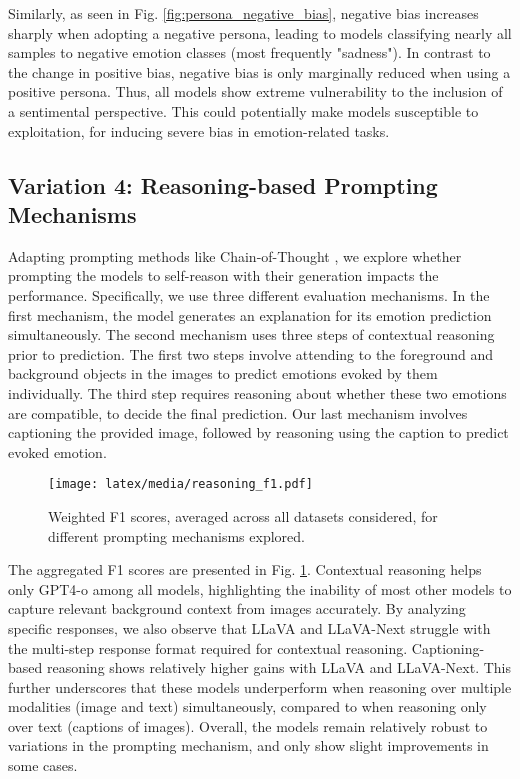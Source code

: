 Similarly, as seen in Fig. \ref{fig:persona_negative_bias}, negative bias increases sharply when adopting a negative persona, leading to models classifying nearly all samples to negative emotion classes (most frequently "sadness"). In contrast to the change in positive bias, negative bias is only marginally reduced when using a positive persona. Thus, all models show extreme vulnerability to the inclusion of a sentimental perspective. This could potentially make models susceptible to exploitation, for inducing severe bias in emotion-related tasks. 

\subsection{Variation 4: Reasoning-based Prompting Mechanisms}
\label{sec:reasoning}

Adapting prompting methods like Chain-of-Thought \cite{wei2022chain}, we explore whether prompting the models to self-reason with their generation impacts the performance. Specifically, we use three different evaluation mechanisms. In the first mechanism, the model generates an explanation for its emotion prediction simultaneously. The second mechanism uses three steps of contextual reasoning prior to prediction. The first two steps involve attending to the foreground and background objects in the images to predict emotions evoked by them individually. The third step requires reasoning about whether these two emotions are compatible, to decide the final prediction. Our last mechanism involves captioning the provided image, followed by reasoning using the caption to predict evoked emotion. 

\begin{figure}
    \centering
    \texttt{[image: latex/media/reasoning\_f1.pdf]}
    \caption{Weighted F1 scores, averaged across all datasets considered, for different prompting mechanisms explored.}
    \label{fig:reasoning_f1}
\end{figure}

The aggregated F1 scores are presented in Fig. \ref{fig:reasoning_f1}. Contextual reasoning helps only GPT4-o among all models, highlighting the inability of most other models to capture relevant background context from images accurately. By analyzing specific responses, we also observe that LLaVA and LLaVA-Next struggle with the multi-step response format required for contextual reasoning. Captioning-based reasoning shows relatively higher gains with LLaVA and LLaVA-Next. This further underscores that these models underperform when reasoning over multiple modalities (image and text) simultaneously, compared to when reasoning only over text (captions of images). Overall, the models remain relatively robust to variations in the prompting mechanism, and only show slight improvements in some cases. 

